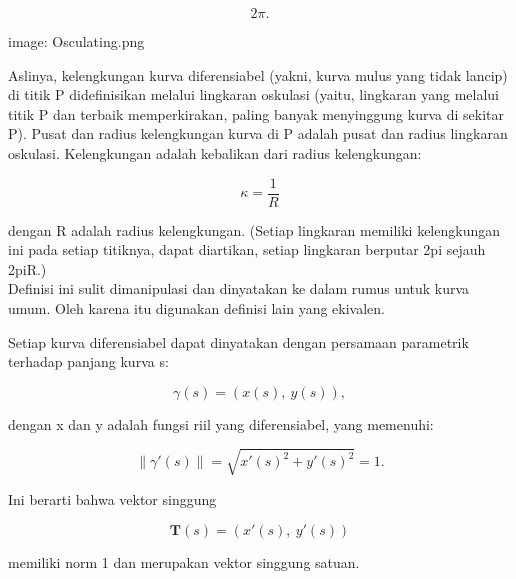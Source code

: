 \documentclass[a4paper,10pt]{article}
\begin{document}
\begin{eulernotebook}
\begin{eulercomment}
\begin{eulercomment}
\begin{eulercomment}
\begin{eulercomment}
\begin{eulercomment}
\end{eulercomment}
\begin{eulerformula}
\[
2\pi.
\]
\end{eulerformula}
\begin{eulercomment}
image: Osculating.png

Aslinya, kelengkungan kurva diferensiabel (yakni, kurva mulus yang tidak lancip) di titik P didefinisikan melalui lingkaran
oskulasi (yaitu, lingkaran yang melalui titik P dan terbaik memperkirakan, paling banyak menyinggung kurva di sekitar P). Pusat
dan radius kelengkungan kurva di P adalah pusat dan radius lingkaran oskulasi. Kelengkungan adalah kebalikan dari radius
kelengkungan:

\end{eulercomment}
\begin{eulerformula}
\[
\kappa =\frac {1}{R}
\]
\end{eulerformula}
\begin{eulercomment}
dengan R adalah radius kelengkungan. (Setiap lingkaran memiliki kelengkungan ini pada setiap titiknya, dapat diartikan, setiap
lingkaran berputar 2pi sejauh 2piR.)\\
Definisi ini sulit dimanipulasi dan dinyatakan ke dalam rumus untuk kurva umum. Oleh karena itu digunakan definisi lain yang
ekivalen.

\end{eulercomment}
\begin{eulercomment}
Setiap kurva diferensiabel dapat dinyatakan dengan persamaan parametrik terhadap panjang kurva s:

\end{eulercomment}
\begin{eulerformula}
\[
\gamma(s) = (x(s),\ y(s)),
\]
\end{eulerformula}
\begin{eulercomment}
dengan x dan y adalah fungsi riil yang diferensiabel, yang memenuhi:

\end{eulercomment}
\begin{eulerformula}
\[
\|\gamma'(s)\|=\sqrt{x'(s)^2+y'(s)^2}=1.
\]
\end{eulerformula}
\begin{eulercomment}
Ini berarti bahwa vektor singgung


\end{eulercomment}
\begin{eulerformula}
\[
\mathbf{T}(s)=(x'(s),\ y'(s))
\]
\end{eulerformula}
\begin{eulercomment}
memiliki norm 1 dan merupakan vektor singgung satuan.


\end{eulercomment}
\end{eulercomment}
\end{eulercomment}
\end{eulercomment}
\end{eulercomment}
\end{eulernotebook}
\end{document}
